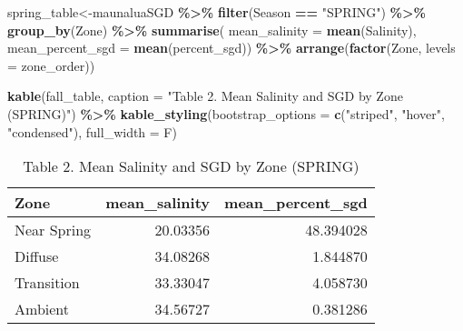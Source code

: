 \documentclass[
]{article}
\newenvironment{Shaded}{\begin{snugshade}}{\end{snugshade}}
\newcommand{\AttributeTok}[1]{\textcolor[rgb]{0.13,0.29,0.53}{#1}}
\newcommand{\FunctionTok}[1]{\textcolor[rgb]{0.13,0.29,0.53}{\textbf{#1}}}
\newcommand{\NormalTok}[1]{#1}
\newcommand{\OtherTok}[1]{\textcolor[rgb]{0.56,0.35,0.01}{#1}}
\newcommand{\SpecialCharTok}[1]{\textcolor[rgb]{0.81,0.36,0.00}{\textbf{#1}}}
\newcommand{\StringTok}[1]{\textcolor[rgb]{0.31,0.60,0.02}{#1}}
\begin{document}
\begin{Shaded}
\begin{Highlighting}[]
\NormalTok{spring\_table}\OtherTok{\textless{}{-}}\NormalTok{maunaluaSGD }\SpecialCharTok{\%\textgreater{}\%}
  \FunctionTok{filter}\NormalTok{(Season }\SpecialCharTok{==} \StringTok{"SPRING"}\NormalTok{) }\SpecialCharTok{\%\textgreater{}\%}
  \FunctionTok{group\_by}\NormalTok{(Zone) }\SpecialCharTok{\%\textgreater{}\%}
  \FunctionTok{summarise}\NormalTok{(}
    \AttributeTok{mean\_salinity =} \FunctionTok{mean}\NormalTok{(Salinity),}
    \AttributeTok{mean\_percent\_sgd =} \FunctionTok{mean}\NormalTok{(percent\_sgd)) }\SpecialCharTok{\%\textgreater{}\%}
  \FunctionTok{arrange}\NormalTok{(}\FunctionTok{factor}\NormalTok{(Zone, }\AttributeTok{levels =}\NormalTok{ zone\_order))}

\FunctionTok{kable}\NormalTok{(fall\_table, }\AttributeTok{caption =} \StringTok{"Table 2. Mean Salinity and SGD by Zone (SPRING)"}\NormalTok{) }\SpecialCharTok{\%\textgreater{}\%}
  \FunctionTok{kable\_styling}\NormalTok{(}\AttributeTok{bootstrap\_options =} \FunctionTok{c}\NormalTok{(}\StringTok{"striped"}\NormalTok{, }
                                      \StringTok{"hover"}\NormalTok{, }
                                      \StringTok{"condensed"}\NormalTok{), }\AttributeTok{full\_width =}\NormalTok{ F)}
\end{Highlighting}
\end{Shaded}

\begin{longtable}[t]{lrr}
\caption{\label{tab:unnamed-chunk-6}Table 2. Mean Salinity and SGD by Zone (SPRING)}\\
\toprule
Zone & mean\_salinity & mean\_percent\_sgd\\
\midrule
Near Spring & 20.03356 & 48.394028\\
Diffuse & 34.08268 & 1.844870\\
Transition & 33.33047 & 4.058730\\
Ambient & 34.56727 & 0.381286\\
\bottomrule
\end{longtable}
\end{document}
